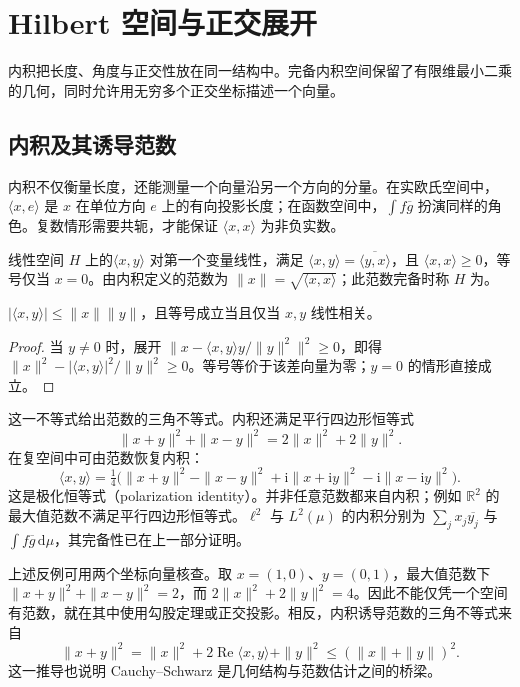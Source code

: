 \documentclass[UTF8,12pt,a4paper,fontset=fandol]{ctexbook}
\begin{document}
\chapter{Hilbert 空间与正交展开}
\label{chap:fa-hilbert}

内积把长度、角度与正交性放在同一结构中。完备内积空间保留了有限维最小二乘的几何，同时允许用无穷多个正交坐标描述一个向量。

\section{内积及其诱导范数}
内积不仅衡量长度，还能测量一个向量沿另一个方向的分量。在实欧氏空间中，$\langle x,e\rangle$ 是 $x$ 在单位方向 $e$ 上的有向投影长度；在函数空间中，$\int f\overline g$ 扮演同样的角色。复数情形需要共轭，才能保证 $\langle x,x\rangle$ 为非负实数。

\begin{definition}
线性空间 $H$ 上的$\langle x,y\rangle$ 对第一个变量线性，满足 $\langle x,y\rangle=\overline{\langle y,x\rangle}$，且 $\langle x,x\rangle\geq0$，等号仅当 $x=0$。由内积定义的范数为 $\|x\|=\sqrt{\langle x,x\rangle}$；此范数完备时称 $H$ 为。
\end{definition}
\begin{proposition}
$|\langle x,y\rangle|\leq\|x\|\|y\|$，且等号成立当且仅当 $x,y$ 线性相关。
\end{proposition}
\begin{proof}
当 $y\ne0$ 时，展开 $\|x-\langle x,y\rangle y/\|y\|^2\|^2\geq0$，即得 $\|x\|^2-|\langle x,y\rangle|^2/\|y\|^2\geq0$。等号等价于该差向量为零；$y=0$ 的情形直接成立。
\end{proof}
这一不等式给出范数的三角不等式。内积还满足平行四边形恒等式
\[
 \|x+y\|^2+\|x-y\|^2=2\|x\|^2+2\|y\|^2.
\]
在复空间中可由范数恢复内积：
\[
 \langle x,y\rangle=\tfrac14\bigl(\|x+y\|^2-\|x-y\|^2
 +\mathrm i\|x+\mathrm iy\|^2-\mathrm i\|x-\mathrm iy\|^2\bigr).
\]
这是极化恒等式（polarization identity）。并非任意范数都来自内积；例如 $\mathbb R^2$ 的最大值范数不满足平行四边形恒等式。$\ell^2$ 与 $L^2(\mu)$ 的内积分别为 $\sum_jx_j\overline{y_j}$ 与 $\int f\overline g\,\mathrm d\mu$，其完备性已在上一部分证明。

上述反例可用两个坐标向量核查。取 $x=(1,0)$、$y=(0,1)$，最大值范数下 $\|x+y\|^2+\|x-y\|^2=2$，而 $2\|x\|^2+2\|y\|^2=4$。因此不能仅凭一个空间有范数，就在其中使用勾股定理或正交投影。相反，内积诱导范数的三角不等式来自
\[
 \|x+y\|^2=\|x\|^2+2\operatorname{Re}\langle x,y\rangle+\|y\|^2
 \leq(\|x\|+\|y\|)^2.
\]
这一推导也说明 Cauchy--Schwarz 是几何结构与范数估计之间的桥梁。
\end{document}
